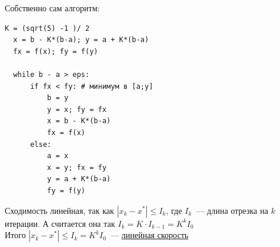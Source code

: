 \begin{method}
  Собственно сам алгоритм:

  \begin{Verbatim}[fontsize=\small]
  K = (sqrt(5) -1 )/ 2
  x = b - K*(b-a); y = a + K*(b-a)
  fx = f(x); fy = f(y)

  while b - a > eps:
      if fx < fy: # минимум в [a;y]
          b = y
          y = x; fy = fx
          x = b - K*(b-a)
          fx = f(x)
      else:
          a = x
          x = y; fx = fy
          y = a + K*(b-a)
          fy = f(y)
  \end{Verbatim}

  Сходимость линейная, так как
  $| x_k - x^{*}| \le I_k$, где $I_k$~--- длина отрезка на $k$ итерации. А считается она так $I_k = K \cdot I_{k-1} = K^k I_0$ \\
  Итого $|x_k - x^{*}| \le I_k = K^k I_0$~--- \hyperref[note:DF2405BF-8B31-47EB-8DEF-B1A88034717C]{линейная скорость}
\end{method}
